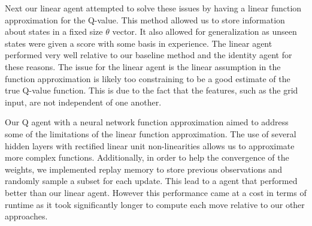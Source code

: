 \documentclass[12pt]{article}
\begin{document}
Next our linear agent attempted to solve these issues by having a linear function approximation for the Q-value. This method allowed us to store information about states in a fixed size $\theta$ vector. It also allowed for generalization as unseen states were given a score with some basis in experience. The linear agent performed very well relative to our baseline method and the identity agent for these reasons. The issue for the linear agent is the linear assumption in the function approximation is likely too constraining to be a good estimate of the true Q-value function. This is due to the fact that the features, such as the grid input, are not independent of one another.

Our Q agent with a neural network function approximation aimed to address some of the limitations of the linear function approximation. The use of several hidden layers with rectified linear unit non-linearities allows us to approximate more complex functions. Additionally, in order to help the convergence of the weights, we implemented replay memory to store previous observations and randomly sample a subset for each update. This lead to a agent that performed better than our linear agent. However this performance came at a cost in terms of runtime as it took significantly longer to compute each move relative to our other approaches.





\printbibliography
\end{document}
